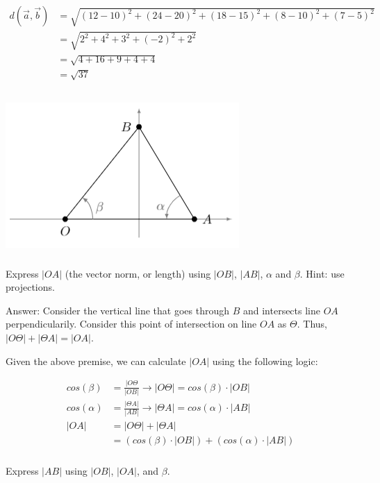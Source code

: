 \documentclass[12pt]{article}
\begin{document}
\begin{align*}
d(\vec{a}, \vec{b}) &= \sqrt{(12 - 10)^2 + (24 - 20)^2 + (18 - 15)^2 + (8 - 10)^2 + (7 - 5)^2} \\
&= \sqrt{2^2 + 4^2 + 3^2 + (-2)^2 + 2^2} \\
&= \sqrt{4 + 16 + 9 + 4 + 4} \\
&= \sqrt{37}
\end{align*}

\color{black}
\subsection{}

\includegraphics{images/2-3-Triangle.png}

\subsubsection{}
Express $|OA|$ (the vector norm, or length) using $|OB|$, $|AB|$, $\alpha$ and $\beta$. Hint: use projections.

\color{blue}
Answer: Consider the vertical line that goes through $B$ and intersects line $OA$ perpendicularily. Consider this point of intersection on line $OA$ as $\Theta$. Thus, $|O \Theta| + |\Theta A| = |OA|$.

Given the above premise, we can calculate $|OA|$ using the following logic:

\begin{align*}
cos(\beta) &= \frac{|O \Theta}{|OB|} \rightarrow |O \Theta| = cos(\beta) \cdot |OB| \\
cos(\alpha) &= \frac{|\Theta A|}{|AB|} \rightarrow |\Theta A| = cos(\alpha) \cdot |AB| \\
|OA| &= |O \Theta| + |\Theta A| \\
&= (cos(\beta) \cdot |OB|) + (cos(\alpha) \cdot |AB|)
\end{align*}

\color{black}
\subsubsection{}
Express $|AB|$ using $|OB|$, $|OA|$, and $\beta$.
\end{document}
